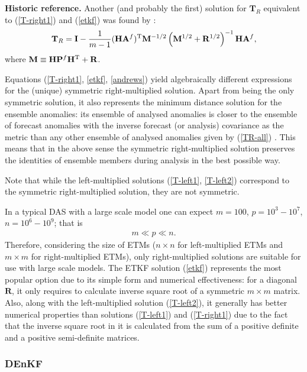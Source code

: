 \documentclass[11pt]{report}
\newcommand{\mb} {\mathbf}
\newcommand{\T}{^{\tiny \mathrm T}}
\begin{document}
{
  \scriptsize
  {\bf Historic reference.} Another (and probably the first) solution for $\mb T_R$ equivalent to (\ref{T-right1}) and (\ref{etkf}) was found by \citet{and68a}:
  \setlength{\abovedisplayskip}{1pt}
  \setlength{\belowdisplayskip}{3pt}
  \begin{align}
    \label{andrews}
    \mb T_R = \mb I - \frac{1}{m-1} (\mb H \mb A^f)\T \mb M^{-1/2} \left(\mb M^{1/2} + \mb R^{1/2}\right)^{-1} \mb H \mb A^f,
  \end{align}
  where $\mb M \equiv \mb H \mb P^f \mb H\T + \mb R$.
}

Equations (\ref{T-right1}, \ref{etkf}, \ref{andrews}) yield algebraically different expressions for the (unique) symmetric right-multiplied solution.
Apart from being the only symmetric solution, it also represents the minimum distance solution for the ensemble anomalies: its ensemble of analysed anomalies is closer to the ensemble of forecast anomalies with the inverse forecast (or analysis) covariance as the metric than any other ensemble of analysed anomalies given by (\ref{TR-all}) \citep{ott03a}.
This means that in the above sense the symmetric right-multiplied solution preserves the identities of ensemble members during analysis in the best possible way.

Note that while the left-multiplied solutions (\ref{T-left1}, \ref{T-left2}) correspond to the symmetric right-multiplied solution, they are not symmetric.

In a typical DAS with a large scale model one can expect $m = 100$, $p = 10^3-10^7$, $n = 10^6-10^9$; that is
\begin{align}
  m \ll p \ll n.
\end{align}
Therefore, considering the size of ETMs ($n \times n$ for left-multiplied ETMs and $m \times m$ for right-multiplied ETMs), only right-multiplied solutions are suitable for use with large scale models.
The ETKF solution (\ref{etkf}) represents the most popular option due to its simple form and numerical effectiveness: for a diagonal $\mb R$, it only requires to calculate inverse square root of a symmetric $m \times m$ matrix.
Also, along with the left-multiplied solution (\ref{T-left2}), it generally has better numerical properties than solutions (\ref{T-left1}) and (\ref{T-right1}) due to the fact that the inverse square root in it is calculated from the sum of a positive definite and a positive semi-definite matrices.

\subsubsection{DEnKF}
\end{document}
